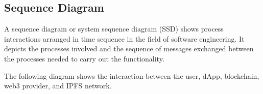 
\newpage

\subsection{Sequence Diagram}

A sequence diagram or system sequence diagram (SSD) shows process interactions arranged in time sequence in the field of software engineering. It depicts the processes involved and the sequence of messages exchanged between the processes needed to carry out the functionality.

The following diagram shows the interaction between the user, dApp, blockchain, web3 provider, and IPFS network.





